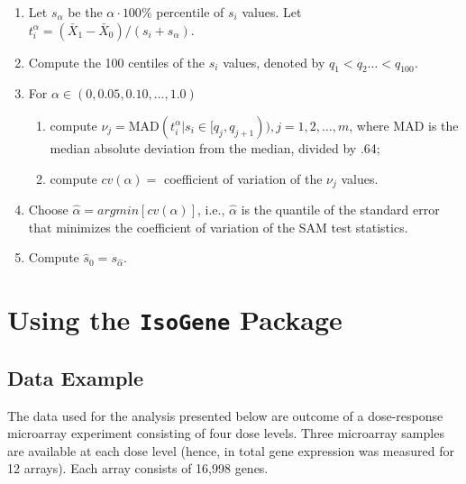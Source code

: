 \documentclass[10pt]{article}
\begin{document}
\begin{enumerate}

\item Let $s_{\alpha}$ be the $\alpha \cdot 100\%$ percentile of $s_i$ values.
Let $t_i^{\alpha}= (\bar{X}_{1}-\bar{X}_{0})/(s_i+s_{\alpha})$.

\item Compute the 100 centiles of the $s_i$ values, denoted by $q_1 <
q_2\dots < q_{100}$.

\item For $\alpha \in (0, 0.05, 0.10, \dots, 1.0)$

\begin{enumerate}

\item compute $\nu_j= \mbox{MAD}(t_i^{\alpha}|s_i \in
[q_j,q_{j+1})),j=1,2,\dots,m$, where \mbox{MAD} is the median
absolute deviation from the median, divided by .64;

\item compute $cv(\alpha)=$ coefficient of variation of the $\nu_j$
values.

\end{enumerate}

\item Choose $\hat{\alpha}=argmin[cv(\alpha)]$, i.e.,
$\hat{\alpha}$ is the quantile of the standard error that minimizes
the coefficient of variation of the SAM test statistics.

\item Compute $\hat{s}_0=s_{\hat{\alpha}}$.

\end{enumerate}




\section{Using the \texttt{IsoGene} Package}

\subsection{Data Example}

The data used for the analysis presented below are outcome of a dose-response microarray experiment
consisting of four dose levels. Three microarray samples are available at each dose level (hence, in total
gene expression was measured for 12 arrays). Each array consists of 16,998 genes.
\end{document}
